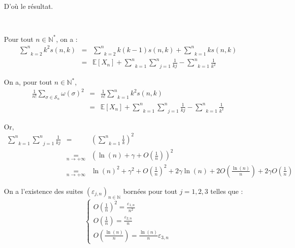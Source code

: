 \

D'o{\`u} le r{\'e}sultat.

\

 Pour tout $n \in \mathbb{N}^{\ast}$, on a :
\begin{eqnarray*}
  \underset{k = 2}{\overset{n}{\sum}} k^2 s (n, k) & = & \underset{k =
  2}{\overset{n}{\sum}} k (k - 1) s (n, k) + \underset{k =
  1}{\overset{n}{\sum}} k s (n, k)\\
  & = & \mathbb{E} [X_n] + \underset{k = 1}{\overset{n}{\sum}} \underset{j =
  1}{\overset{n}{\sum}} \frac{1}{k j} - \underset{k = 1}{\overset{n}{\sum}}
  \frac{1}{k^2}
\end{eqnarray*}


 On a, pour tout $n \in \mathbb{N}^{\ast}$,
\begin{eqnarray*}
  \frac{1}{n!} \underset{\sigma \in \mathcal{S}_n}{\sum} \omega (\sigma)^2 & =
  & \frac{1}{n!} \underset{k = 1}{\overset{n}{\sum}} k^2 s (n, k)\\
  & = & \mathbb{E} [X_n] + \underset{k = 1}{\overset{n}{\sum}} \underset{j =
  1}{\overset{n}{\sum}} \frac{1}{k j} - \underset{k = 1}{\overset{n}{\sum}}
  \frac{1}{k^2}
\end{eqnarray*}


Or,
\begin{eqnarray*}
  \underset{k = 1}{\overset{n}{\sum}} \underset{j = 1}{\overset{n}{\sum}}
  \frac{1}{k j} & = & \left( \underset{k = 1}{\overset{n}{\sum}} \frac{1}{k}
  \right)^2\\
  & \underset{n \rightarrow + \infty}{=} & \left( \ln (n) + \gamma + O \left(
  \frac{1}{n} \right) \right)^2\\
  & \underset{n \rightarrow + \infty}{=} & \ln (n)^2 + \gamma^2 + O \left(
  \frac{1}{n} \right)^2 + 2 \gamma \ln (n) + 2 O \left( \frac{\ln (n)}{n}
  \right) + 2 \gamma O \left( \frac{1}{n} \right)
\end{eqnarray*}


On a l'existence des suites $(\varepsilon_{j, n})_{n \in \mathbb{N}}$
born{\'e}es pour tout $j = 1, 2, 3$ telles que :
\[ \left\{\begin{array}{l}
     O \left( \frac{1}{n} \right)^2 = \frac{\varepsilon_{1, n}}{n^2}\\
     O \left( \frac{1}{n} \right) = \frac{\varepsilon_{2, n}}{n}\\
     O \left( \frac{\ln (n)}{n} \right) = \frac{\ln (n)}{n} \varepsilon_{3, n}
   \end{array}\right. \]


